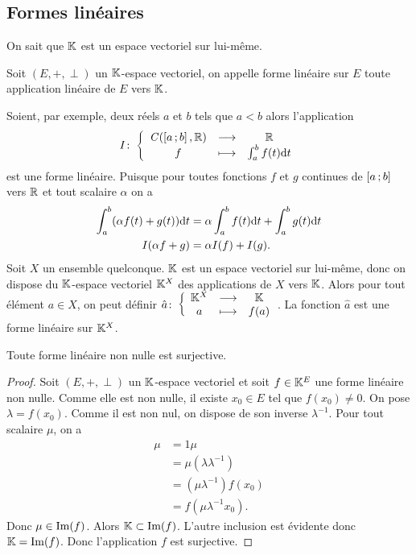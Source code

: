 \subsection{Formes linéaires}
On sait que \(\mathbb{K}\) est un espace vectoriel sur lui-même.
\begin{defdef}
  Soit \((E,+,\perp)\) un \(\mathbb{K}\)-espace vectoriel, on appelle forme linéaire sur
  \(E\) toute application linéaire de \(E\) vers \(\mathbb{K}\).
\end{defdef}

Soient, par exemple, deux réels \(a\) et \(b\) tels que \(a<b\) alors
l'application
\begin{equation}
  I\colon\left\{\begin{array}{ccc}\mathit{C}(\left[ a \, ; {} b \right],\mathbb{R}) & \longrightarrow &\mathbb{R}\\f & \longmapsto & \int_{a}^b f(t)\mathrm{d} t\end{array}\right.
\end{equation}
est une forme linéaire. Puisque pour toutes fonctions \(f\) et \(g\) continues
de \(\left[ a \, ; {} b \right]\) vers \(\mathbb{R}\) et tout scalaire \(\alpha\) on a
\begin{align}
  \int_{a}^b (\alpha f(t)+g(t))\mathrm{d} t &= \alpha \int_{a}^b f(t)\mathrm{d} t + \int_{a}^b
  g(t)\mathrm{d} t \\
  I(\alpha f+g)&=\alpha I(f)+I(g).
\end{align}
Soit \(X\) un ensemble quelconque. \(\mathbb{K}\) est un espace vectoriel sur lui-même,
donc on dispose du \(\mathbb{K}\)-espace vectoriel \(\mathbb{K}^X\) des applications de \(X\)
vers \(\mathbb{K}\). Alors pour tout élément \(a \in X\), on peut définir
\(\hat{a}\colon\left\{\begin{array}{ccc}\mathbb{K}^X & \longrightarrow &\mathbb{K}\\a & \longmapsto & f(a)\end{array}\right.\). La fonction \(\hat{a}\) est une forme
linéaire sur \(\mathbb{K}^X\).
\begin{theo}
  Toute forme linéaire non nulle est surjective.
\end{theo}
\begin{proof}
  Soit \((E,+,\perp)\) un \(\mathbb{K}\)-espace vectoriel et soit \(f \in \mathbb{K}^E\) une
  forme linéaire non nulle. Comme elle est non nulle, il existe \(x_0 \in E\)
  tel que \(f(x_0)\neq 0\). On pose \(\lambda =f(x_0)\). Comme il est non nul,
  on dispose de son inverse \(\lambda^{-1}\). Pour tout scalaire \(\mu\), on a
  \begin{align}
    \mu & =1 \mu \\
    &= \mu (\lambda \lambda^{-1})\\
    &=(\mu\lambda^{-1})f(x_0)\\
    &=f(\mu\lambda^{-1}x_0).
  \end{align}
  Donc \(\mu \in \operatorname{Im}(f)\). Alors \(\mathbb{K} \subset \operatorname{Im}(f)\). L'autre inclusion
  est évidente donc \(\mathbb{K}=\operatorname{Im}(f)\). Donc l'application \(f\) est surjective.
\end{proof}

